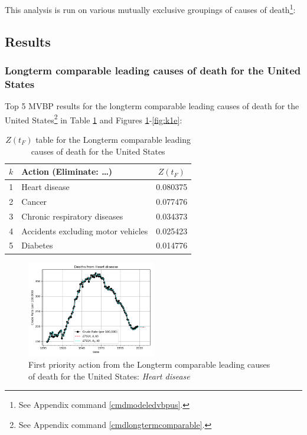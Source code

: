 \documentclass[10pt, a4paper, twocolumn]{IEEEconf}
\begin{document}
This analysis is run on various mutually exclusive groupings of causes of death\footnote{See Appendix command \ref{cmdmodeledvbpus}.}:

\clearpage

\subsection{Results}

\subsubsection{Longterm comparable leading causes of death for the United States}

Top 5 MVBP results for the longterm comparable leading causes of death for the United States\footnote{See Appendix command \ref{cmdlongtermcomparable}.} in Table \ref{table:ztable1} and Figures \ref{fig:k1a}-\ref{fig:k1e}:

\begin{table}[H]
  \centering
  \begin{tabular}{clc}
    \toprule
      $k$ & Action (Eliminate: \ldots) & $Z(t_F)$ \\
    \midrule
      1 &                      Heart disease & 0.080375 \\
      2 &                             Cancer & 0.077476 \\
      3 &       Chronic respiratory diseases & 0.034373 \\
      4 & Accidents excluding motor vehicles & 0.025423 \\
      5 &                           Diabetes & 0.014776 \\
    \bottomrule
  \end{tabular}
  \caption{$Z(t_F)$ table for the Longterm comparable leading causes of death for the United States}
  \label{table:ztable1}
\end{table}

\begin{figure}[H]
  \centering
  \includegraphics[width=0.5\textwidth]{results/US_ICD_LONGTERM_COMPARABLE_LEADING/Heart_disease_ets.png}
  \caption{First priority action from the Longterm comparable leading causes of death for the United States: \textit{Heart disease}}\label{fig:k1a}
\end{figure}
\end{document}
